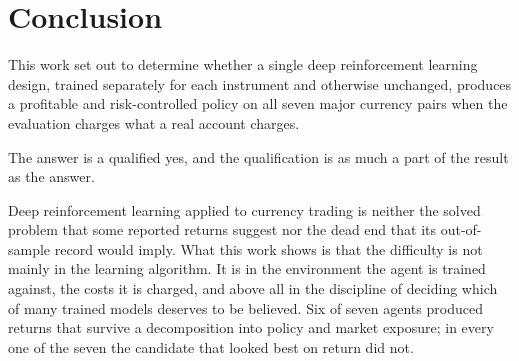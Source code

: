 \section{Conclusion}
\label{Section:Conclusion}

This work set out to determine whether a single deep reinforcement learning design, trained separately for each instrument and otherwise unchanged, produces a profitable and risk-controlled policy on all seven major currency pairs when the evaluation charges what a real account charges.

The answer is a qualified yes, and the qualification is as much a part of the result as the answer.







Deep reinforcement learning applied to currency trading is neither the solved problem that some reported returns suggest nor the dead end that its out-of-sample record would imply. What this work shows is that the difficulty is not mainly in the learning algorithm. It is in the environment the agent is trained against, the costs it is charged, and above all in the discipline of deciding which of many trained models deserves to be believed. Six of seven agents produced returns that survive a decomposition into policy and market exposure; in every one of the seven the candidate that looked best on return did not.
